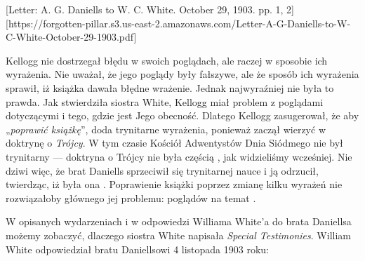 

[Letter: A. G. Daniells to W. C. White. October 29, 1903. pp. 1, 2][https://forgotten-pillar.s3.us-east-2.amazonaws.com/Letter-A-G-Daniells-to-W-C-White-October-29-1903.pdf]

Kellogg nie dostrzegał błędu w swoich poglądach, ale raczej w sposobie ich wyrażenia. Nie uważał, że jego poglądy były fałszywe, ale że sposób ich wyrażenia sprawił, iż książka dawała błędne wrażenie. Jednak najwyraźniej nie była to prawda. Jak stwierdziła siostra White, Kellogg miał problem z poglądami dotyczącymi  i tego, gdzie jest Jego obecność. Dlatego Kellogg zasugerował, że aby „\textit{poprawić książkę}”, doda trynitarne wyrażenia, ponieważ zaczął wierzyć w doktrynę o \textit{Trójcy}. W tym czasie Kościół Adwentystów Dnia Siódmego nie był trynitarny — doktryna o Trójcy nie była częścią , jak widzieliśmy wcześniej. Nie dziwi więc, że brat Daniells sprzeciwił się trynitarnej nauce i ją odrzucił, twierdząc, iż była ona . Poprawienie książki poprzez zmianę kilku wyrażeń nie rozwiązałoby głównego jej problemu: poglądów na temat .

W opisanych wydarzeniach i w odpowiedzi Williama White'a do brata Daniellsa możemy zobaczyć, dlaczego siostra White napisała \textit{Special Testimonies}. William White odpowiedział bratu Daniellsowi 4 listopada 1903 roku:


